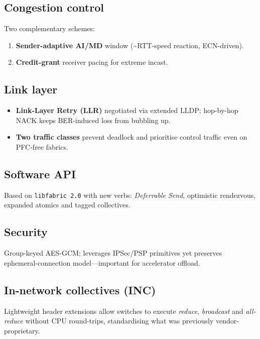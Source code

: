 \subsection*{Congestion control}
Two complementary schemes:  
\begin{enumerate}[label={(\arabic*)},leftmargin=*]
  \item \textbf{Sender-adaptive AI/MD} window (\textasciitilde{}RTT-speed
        reaction, ECN-driven).  
  \item \textbf{Credit-grant} receiver pacing for extreme
        incast.
\end{enumerate}

\subsection*{Link layer}
\begin{itemize}
  \item \textbf{Link-Layer Retry (LLR)} negotiated via extended LLDP; hop-by-hop
        NACK keeps BER-induced loss from bubbling up.
  \item \textbf{Two traffic classes} prevent deadlock and prioritise control
        traffic even on PFC-free fabrics.
\end{itemize}

\subsection*{Software API}
Based on \texttt{libfabric 2.0} with new verbs:
\emph{Deferrable Send}, optimistic rendezvous, expanded atomics and tagged
collectives.

\subsection*{Security}
Group-keyed AES-GCM; leverages IPSec/PSP primitives yet preserves
ephemeral-connection model—important for accelerator offload.

\subsection*{In-network collectives (INC)}
Lightweight header extensions allow switches to execute
\textit{reduce}, \textit{broadcast} and \textit{all-reduce} without CPU
round-trips, standardising what was previously vendor-proprietary.


